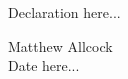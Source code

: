 \begin{declaration}

Declaration here...

\begin{flushright}
Matthew Allcock
\\
Date here...
\end{flushright}

\end{declaration}